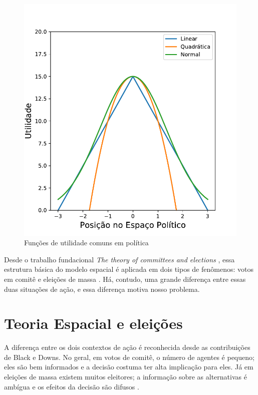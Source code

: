 \begin{figure}[H]
  \centering
  \caption{Funções de utilidade comuns em política}
  \includegraphics[scale = 0.6]{ims/utilities.pdf}
 \end{figure}

Desde o trabalho fundacional \textit{The theory of committees and
  elections} \cite{black1958theory}, essa estrutura básica do modelo espacial é
aplicada em dois tipos de fenômenos: votos em comitê e eleições de massa
\cite{munger2015choosing}. Há, contudo, uma grande diferença entre essas duas
situações de ação, e essa diferença motiva nosso problema.


\section{Teoria Espacial e eleições}


A diferença entre os dois contextos de ação é reconhecida desde as contribuições
de Black e Downs. No geral, em votos de comitê, o número de agentes é pequeno;
eles são bem informados e a decisão costuma ter alta implicação para eles. Já em
eleições de massa existem muitos eleitores; a informação sobre as alternativas é
ambígua e os efeitos da decisão são difusos \cite{munger2015choosing}.

